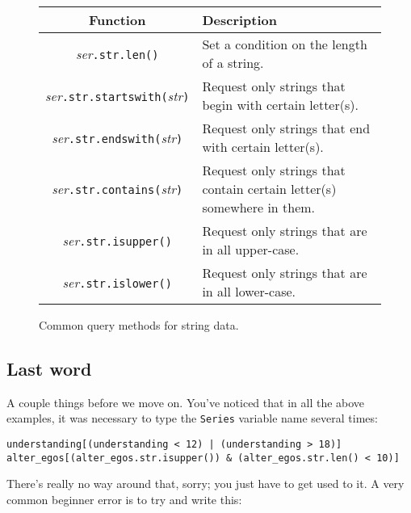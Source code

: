 \setlength\extrarowheight{5pt}

\begin{figure}[ht]
\centering
\footnotesize
\begin{tabular}{c|p{2.8in}}
Function & Description \\
\hline

\textsl{ser}\texttt{.str.len()} & Set a condition on the length of a string. \\

\textsl{ser}\texttt{.str.startswith(}\textsl{str}\texttt{)} & Request only
strings that begin with certain letter(s). \\

\textsl{ser}\texttt{.str.endswith(}\textsl{str}\texttt{)} & Request only
strings that end with certain letter(s). \\

\textsl{ser}\texttt{.str.contains(}\textsl{str}\texttt{)} & Request only
strings that contain certain letter(s) somewhere in them. \\

\textsl{ser}\texttt{.str.isupper()} & Request only strings that are in all
upper-case. \\

\textsl{ser}\texttt{.str.islower()} & Request only strings that are in all
lower-case. \\

\end{tabular}
\bigskip
\caption{Common query methods for string data.}
\label{fig:stringQueryFunctions}
\end{figure}

\subsection{Last word}

A couple things before we move on. You've noticed that in all the above
examples, it was necessary to type the \texttt{Series} variable name several
times:

\begin{Verbatim}[fontsize=\scriptsize,samepage=true,frame=single,framesep=3mm]
understanding[(understanding < 12) | (understanding > 18)]
alter_egos[(alter_egos.str.isupper()) & (alter_egos.str.len() < 10)]
\end{Verbatim}

There's really no way around that, sorry; you just have to get used to it. A
very common beginner error is to try and write this:

